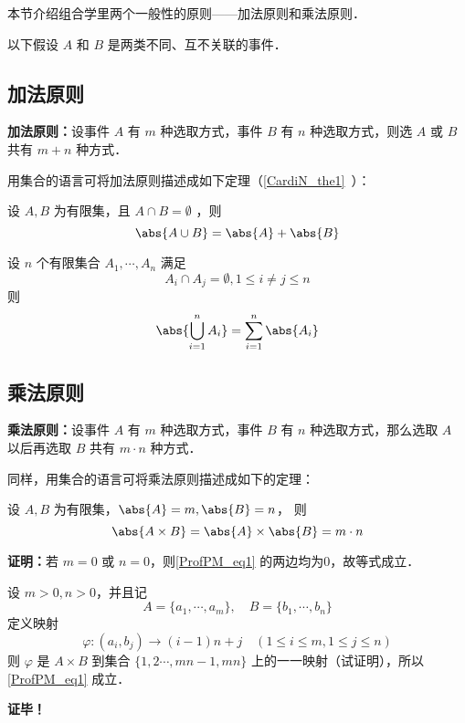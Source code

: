 
本节介绍组合学里两个一般性的原则——加法原则和乘法原则．

以下假设 $A$ 和 $B$ 是两类不同、互不关联的事件．
\subsection{加法原则}
\textbf{加法原则：}设事件 $A$ 有 $m$ 种选取方式，事件 $B$ 有 $n$ 种选取方式，则选 $A$ 或 $B$ 共有 $m+n$ 种方式．

用集合的语言可将加法原则描述成如下定理（\autoref{CardiN_the1}~）：
\begin{theorem}{}
设 $A,B$ 为有限集，且 $A\cap B=\emptyset$ ，则
\begin{equation}
\abs{A\cup B}=\abs{A}+\abs{B}
\end{equation}
\end{theorem}
\begin{corollary}{}
设 $n$ 个有限集合 $A_1,\cdots,A_n$ 满足
\begin{equation}
A_i\cap A_j=\emptyset,1\leq i\neq j\leq n
\end{equation}
则
\begin{equation}
\abs{\bigcup_{i=1}^n A_i}=\sum_{i=1}^n\abs{A_i}
\end{equation}

\end{corollary}
\subsection{乘法原则}
\textbf{乘法原则：}设事件 $A$ 有 $m$ 种选取方式，事件 $B$ 有 $n$ 种选取方式，那么选取 $A$ 以后再选取 $B$ 共有 $m\cdot n$ 种方式．

同样，用集合的语言可将乘法原则描述成如下的定理：
\begin{theorem}{}
设 $A,B$ 为有限集，$\abs{A}=m,\abs{B}=n$， 则
\begin{equation}\label{ProfPM_eq1}
\abs{A\times B}=\abs{A}\times\abs{B}=m\cdot n
\end{equation}
\end{theorem}
\textbf{证明：}若 $m=0$ 或 $n=0$，则\autoref{ProfPM_eq1} 的两边均为0，故等式成立．

设 $m>0,n>0$，并且记
\begin{equation}
A=\{a_1,\cdots,a_m\},\quad B=\{b_1,\cdots,b_n\}
\end{equation}
定义映射
\begin{equation}
\varphi:(a_i,b_j)\rightarrow (i-1)n+j\quad (1\leq i\leq m,1\leq j\leq n)
\end{equation}
则 $\varphi$ 是 $A\times B$ 到集合 $\{1,2\cdots,mn-1,mn\}$ 上的一一映射（试证明），所以\autoref{ProfPM_eq1} 成立．

\textbf{证毕！}